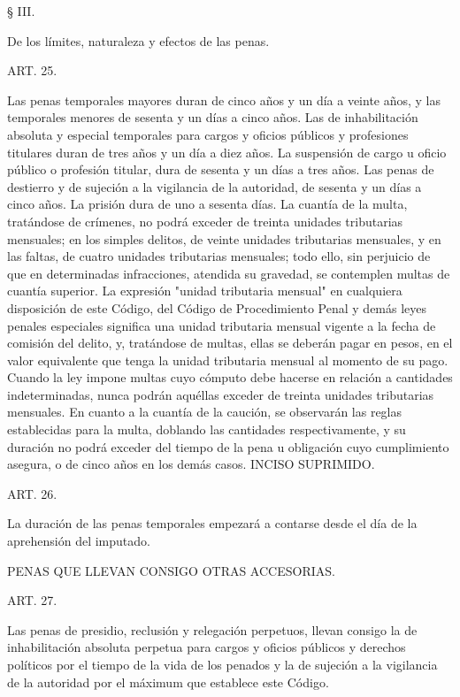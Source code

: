    
    § III.

   
    De los límites, naturaleza y efectos de las penas.

    ART. 25.

    Las penas temporales mayores duran de cinco años y un día a veinte años, y las temporales menores de sesenta y un días a cinco años.
    Las de inhabilitación absoluta y especial temporales para cargos y oficios públicos y profesiones titulares duran de tres años y un día a diez años.
    La suspensión de cargo u oficio público o profesión titular, dura de sesenta y un días a tres años.
    Las penas de destierro y de sujeción a la vigilancia de la autoridad, de sesenta y un días a cinco años.
    La prisión dura de uno a sesenta días.
    La cuantía de la multa, tratándose de crímenes, no podrá exceder de treinta unidades tributarias mensuales; en los simples delitos, de veinte unidades tributarias mensuales, y en las faltas, de cuatro unidades tributarias mensuales; todo ello, sin perjuicio de que en determinadas infracciones, atendida su gravedad, se contemplen multas de cuantía superior.
    La expresión "unidad tributaria mensual" en cualquiera disposición de este Código, del Código de Procedimiento Penal y demás leyes penales especiales significa una unidad tributaria mensual vigente a la fecha de comisión del delito, y, tratándose de multas, ellas se deberán pagar en pesos, en el valor equivalente que tenga la unidad tributaria mensual al momento de su pago.
    Cuando la ley impone multas cuyo cómputo debe hacerse en relación a cantidades indeterminadas, nunca podrán aquéllas exceder de treinta unidades tributarias mensuales.
    En cuanto a la cuantía de la caución, se observarán las reglas establecidas para la multa, doblando las cantidades respectivamente, y su duración no podrá exceder del tiempo de la pena u obligación cuyo cumplimiento asegura, o de cinco años en los demás casos.
    INCISO SUPRIMIDO.




    ART. 26.

    La duración de las penas temporales empezará a contarse desde el día de la aprehensión del imputado.

    PENAS QUE LLEVAN CONSIGO OTRAS ACCESORIAS.


    ART. 27.

    Las penas de presidio, reclusión y relegación perpetuos, llevan consigo la de inhabilitación absoluta perpetua para cargos y oficios públicos y derechos políticos por el tiempo de la vida de los penados y la de sujeción a la vigilancia de la autoridad por el máximum que establece este Código.



